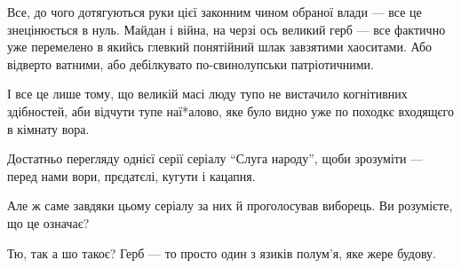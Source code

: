 Все, до чого дотягуються руки цієї законним чином обраної влади --- все це
знецінюється в нуль. Майдан і війна, на черзі ось великий герб --- все фактично
уже перемелено в якийсь глевкий понятійний шлак завзятими хаоситами. Або
відверто ватними, або дебілкувато по-свинолупськи патріотичними.

І все це лише тому, що великій масі люду тупо не вистачило когнітивних
здібностей, аби відчути тупе наї*алово, яке було видно уже по походкє входящєго
в кімнату вора.

Достатньо перегляду однієї серії серіалу \enquote{Слуга народу}, щоби зрозуміти --- перед
нами вори, прєдатєлі, кугути і кацапня.

Але ж саме завдяки цьому серіалу за них й проголосував виборець. Ви розумієте,
що це означає?

Тю, так а шо такоє? Герб --- то просто один з язиків полум'я, яке жере будову.

